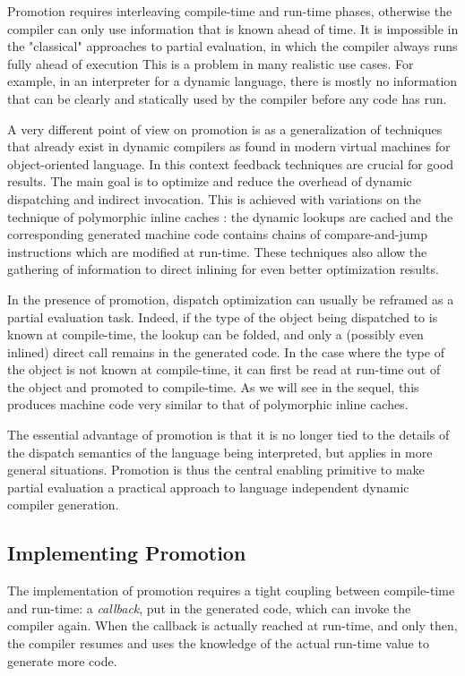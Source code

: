 Promotion requires interleaving compile-time and run-time phases,
otherwise the compiler can only use information that is known ahead of
time. It is impossible in the "classical" approaches to partial
evaluation, in which the compiler always runs fully ahead of execution
This is a problem in many realistic use cases.  For example, in an
interpreter for a dynamic language, there is mostly no information
that can be clearly and statically used by the compiler before any
code has run.

A very different point of view on promotion is as a generalization of techniques
that already exist in dynamic compilers as found in modern virtual machines for
object-oriented language.  In this context feedback
techniques are crucial for good results.  The main goal is to
optimize and reduce the overhead of dynamic dispatching and indirect
invocation.  This is achieved with variations on the technique of
polymorphic inline caches \cite{hoelzle_optimizing_1991}: the dynamic lookups are cached and
the corresponding generated machine code contains chains of
compare-and-jump instructions which are modified at run-time.  These
techniques also allow the gathering of information to direct inlining for even
better optimization results.

In the presence of promotion, dispatch optimization can usually be
reframed as a partial evaluation task.  Indeed, if the type of the
object being dispatched to is known at compile-time, the lookup can be
folded, and only a (possibly even inlined) direct call remains in the
generated code.  In the case where the type of the object is not known
at compile-time, it can first be read at run-time out of the object and
promoted to compile-time.  As we will see in the sequel, this produces
machine code very similar to that of polymorphic inline
caches.

The essential advantage of promotion is that it is no longer tied to the details of
the dispatch semantics of the language being interpreted, but applies in
more general situations.  Promotion is thus the central enabling
primitive to make partial evaluation a practical approach to language
independent dynamic compiler generation.

\subsection{Implementing Promotion}

The implementation of promotion requires a tight coupling between
compile-time and run-time: a \emph{callback}, put in the generated code,
which can invoke the compiler again.  When the callback is actually
reached at run-time, and only then, the compiler resumes and uses the
knowledge of the actual run-time value to generate more code.

